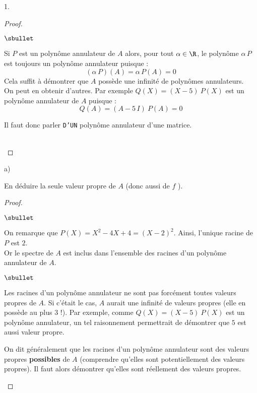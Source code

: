 \documentclass[11pt]{article}%
\begin{document}
\begin{noliste}{1.}
\begin{proof}
\begin{remark}
\begin{noliste}{$\sbullet$}
      \item Si $P$ est un polynôme annulateur de $A$ alors, pour tout
        $\alpha \in \R$, le polynôme $\alpha \, P$ est toujours un
        polynôme annulateur puisque :
        \[
        (\alpha \, P)(A) = \alpha \, P(A) = 0
        \]
        Cela suffit à démontrer que $A$ possède une infinité de
        polynômes annulateurs. \\
        On peut en obtenir d'autres. Par exemple $Q(X) = (X-5) \ P(X)$
        est un polynôme annulateur de $A$ puisque :
        \[
        Q(A) = (A - 5 \, I) \ P(A) = 0
        \]
      \item Il faut donc parler {\tt D'UN} polynôme annulateur d'une
        matrice.
      \end{noliste}
    \end{remark}    
    ~\\[-1.2cm]
  \end{proof}

\item
  \begin{noliste}{a)}
    \setlength{\itemsep}{2mm}
  \item En déduire la seule valeur propre de $A$ (donc aussi de $f$ ).

    \begin{proof}~
      \begin{noliste}{$\sbullet$}
      \item On remarque que $P(X) = X^2 -4X +4 = (X-2)^2$. Ainsi,
        l'unique racine de $P$ est $2$.\\
        Or le spectre de $A$ est inclus dans l'ensemble des racines
        d'un polynôme annulateur de $A$.%


        \newpage


        \begin{remark}%
          \begin{noliste}{$\sbullet$}
          \item Les racines d'un polynôme annulateur ne sont pas
            forcément toutes valeurs propres de $A$. Si c'était le
            cas, $A$ aurait une infinité de valeurs propres (elle en
            possède au plus $3$ !). Par exemple, comme $Q(X) = (X-5) \
            P(X)$ est un polynôme annulateur, un tel raisonnement
            permettrait de démontrer que $5$ est aussi valeur propre.

          \item On dit généralement que les racines d'un polynôme
            annulateur sont des valeurs propres {\bf possibles} de $A$
            (comprendre qu'elles sont potentiellement des valeurs
            propres). Il faut alors démontrer qu'elles sont
            réellement des valeurs propres.
          \end{noliste}
        \end{remark}


\end{noliste}
\end{proof}
\end{noliste}
\end{noliste}
\end{document}
